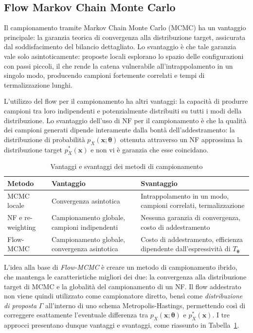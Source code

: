 \subsection{Flow Markov Chain Monte Carlo}
\label{subsec:flow-mcmc}
Il campionamento tramite Markov Chain Monte Carlo (MCMC) ha un vantaggio principale: la garanzia teorica di convergenza alla distribuzione target, assicurata dal soddisfacimento del bilancio dettagliato. Lo svantaggio è che tale garanzia vale solo asintoticamente: proposte locali esplorano lo spazio delle configurazioni con passi piccoli, il che rende la catena vulnerabile all'intrappolamento in un singolo modo, producendo campioni fortemente correlati e tempi di termalizzazione lunghi.

L'utilizzo del flow per il campionamento ha altri vantaggi: la capacità di produrre campioni tra loro indipendenti e potenzialmente distribuiti su tutti i modi della distribuzione. Lo svantaggio dell'uso di NF per il campionamento è che la qualità dei campioni generati dipende interamente dalla bontà dell'addestramento: la distribuzione di probabilità $p_X(\mathbf{x};\boldsymbol{\theta})$ ottenuta attraverso un NF approssima la distribuzione target $p_X^*(\mathbf{x})$ e non vi è garanzia che esse coincidano. 

\begin{table}[b]
    \centering
    \caption{Vantaggi e svantaggi dei metodi di campionamento}
    \label{tab:confronto_metodi}
    \renewcommand{\arraystretch}{1.3}
    \begin{tabularx}{\textwidth}{l X X}
        \toprule
        \textbf{Metodo} & \textbf{Vantaggio} & \textbf{Svantaggio} \\
        \midrule
        MCMC locale & Convergenza asintotica & Intrappolamento in un modo, campioni correlati, termalizzazione \\
        NF e re-weighting & Campionamento globale, campioni indipendenti & Nessuna garanzia di convergenza, costo di addestramento \\
        Flow-MCMC & Campionamento globale, convergenza asintotica & Costo di addestramento, efficienza dipendente dall'espressività di $T_{\boldsymbol{\theta}}$ \\
        \bottomrule
    \end{tabularx}
\end{table}

L'idea alla base di \emph{Flow-MCMC} è creare un metodo di campionamento ibrido, che mantenga le caratteristiche migliori dei due: la convergenza alla distribuzione target di MCMC e la globalità del campionamento di un NF. Il flow addestrato non viene quindi utilizzato come campionatore diretto, bensì come \emph{distribuzione di proposta} $\Gamma$ all'interno di uno schema Metropolis-Hastings, permettendo così di correggere esattamente l'eventuale differenza tra $p_X(\mathbf{x};\boldsymbol{\theta})$ e $p_X^*(\mathbf{x})$. I tre approcci presentano dunque vantaggi e svantaggi, come riassunto in Tabella~\ref{tab:confronto_metodi}.

